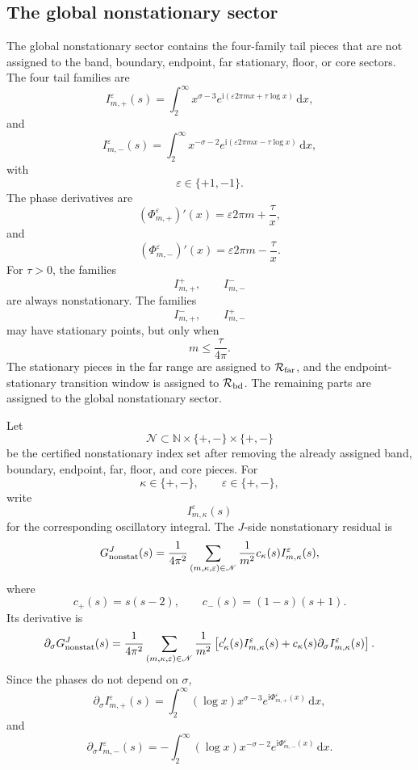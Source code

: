 \documentclass[11pt]{article}
\newcommand{\ii}{\mathrm{i}}
\newcommand{\dd}{\mathrm{d}}
\newcommand{\eps}{\varepsilon}
\newcommand{\s}{s}
\newcommand{\sig}{\sigma}
\newcommand{\tauh}{\tau}
\newcommand{\Rbd}{\mathcal R_{\rm bd}}
\newcommand{\Rfar}{\mathcal R_{\rm far}}
\begin{document}
\subsection{The global nonstationary sector}

The global nonstationary sector contains the four-family tail pieces that are
not assigned to the band, boundary, endpoint, far stationary, floor, or core
sectors.  The four tail families are
\[
        I_{m,+}^{\eps}(\s)
        =
        \int_2^\infty
        x^{\sig-3}
        e^{\ii(\eps 2\pi m x+\tauh\log x)}
        \,\dd x,
\]
and
\[
        I_{m,-}^{\eps}(\s)
        =
        \int_2^\infty
        x^{-\sig-2}
        e^{\ii(\eps 2\pi m x-\tauh\log x)}
        \,\dd x,
\]
with
\[
        \eps\in\{+1,-1\}.
\]
The phase derivatives are
\[
        (\Phi_{m,+}^{\eps})'(x)
        =
        \eps 2\pi m+\frac{\tauh}{x},
\]
and
\[
        (\Phi_{m,-}^{\eps})'(x)
        =
        \eps 2\pi m-\frac{\tauh}{x}.
\]
For \(\tauh>0\), the families
\[
        I_{m,+}^{+},
        \qquad
        I_{m,-}^{-}
\]
are always nonstationary.  The families
\[
        I_{m,+}^{-},
        \qquad
        I_{m,-}^{+}
\]
may have stationary points, but only when
\[
        m\le\frac{\tauh}{4\pi}.
\]
The stationary pieces in the far range are assigned to \(\Rfar\), and the
endpoint-stationary transition window is assigned to \(\Rbd\).  The remaining
parts are assigned to the global nonstationary sector.

Let
\[
        \mathscr N
        \subset
        \mathbb N\times\{+,-\}\times\{+,-\}
\]
be the certified nonstationary index set after removing the already assigned
band, boundary, endpoint, far, floor, and core pieces.  For
\[
        \kappa\in\{+,-\},
        \qquad
        \eps\in\{+,-\},
\]
write
\[
        I_{m,\kappa}^{\eps}(\s)
\]
for the corresponding oscillatory integral.  The \(J\)-side nonstationary
residual is
\[
        G_{\rm nonstat}^{J}(\s)
        =
        \frac{1}{4\pi^2}
        \sum_{(m,\kappa,\eps)\in\mathscr N}
        \frac{1}{m^2}
        c_\kappa(\s)
        I_{m,\kappa}^{\eps}(\s),
\]
where
\[
        c_+(\s)=\s(\s-2),
        \qquad
        c_-(\s)=(1-\s)(\s+1).
\]
Its derivative is
\[
\begin{aligned}
        \partial_\sig G_{\rm nonstat}^{J}(\s)
        =
        \frac{1}{4\pi^2}
        \sum_{(m,\kappa,\eps)\in\mathscr N}
        \frac{1}{m^2}
        \left[
            c_\kappa'(\s)
            I_{m,\kappa}^{\eps}(\s)
            +
            c_\kappa(\s)
            \partial_\sig I_{m,\kappa}^{\eps}(\s)
        \right].
\end{aligned}
\]
Since the phases do not depend on \(\sig\),
\[
        \partial_\sig I_{m,+}^{\eps}(\s)
        =
        \int_2^\infty
        (\log x)x^{\sig-3}
        e^{\ii\Phi_{m,+}^{\eps}(x)}
        \,\dd x,
\]
and
\[
        \partial_\sig I_{m,-}^{\eps}(\s)
        =
        -
        \int_2^\infty
        (\log x)x^{-\sig-2}
        e^{\ii\Phi_{m,-}^{\eps}(x)}
        \,\dd x.
\]
\end{document}
